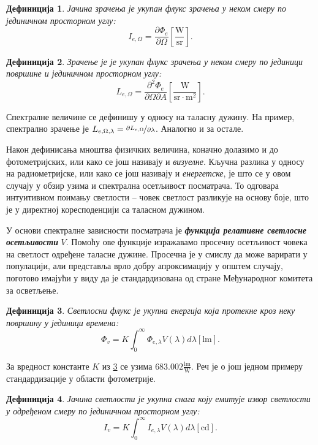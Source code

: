 \documentclass[12pt, a4paper, twoside]{book}
\numberwithin{equation}{chapter}
\numberwithin{theorem}{section}
\newtheorem{definition}{Дефиниција}
\numberwithin{definition}{section}
\numberwithin{definitionChapter}{chapter}
\begin{document}
\begin{definition}
	Јачина зрачења је укупан флукс зрачења у неком смеру по јединичном просторном углу:
	$$I_{e, \Omega} = \frac{\partial \Phi_e}{\partial \Omega} \left[\mathrm{\frac{W}{sr}}\right].$$
\end{definition}

\begin{definition}
	Зрачење је је укупан флукс зрачења у неком смеру по јединици површине и јединичном просторном углу:
	$$L_{e, \Omega} = \frac{\partial^2 \Phi_e}{\partial \Omega \partial A} \left[\mathrm{\frac{W}{sr \cdot m^2}}\right].$$
\end{definition}

Спектралне величине се дефинишу у односу на таласну дужину. На пример, спектрално зрачење
је $L_{e, \Omega, \lambda} = \nicefrac{\partial L_{e, \Omega}}{\partial \lambda}$.
Аналогно и за остале.

Након дефинисања мноштва физичких величина, коначно долазимо и до фотометријских, или како се
још називају и \textit{визуелне}. Кључна разлика у односу на радиометријске, или како се још
називају и \textit{енергетске}, је што се у овом случају у обзир узима и спектрална
осетљивост посматрача. То одговара интуитивном поимању светлости -- човек светлост разликује на
основу боје, што је у директној коресподенцији са таласном дужином.

У основи спектралне зависности посматрача је \textbf{\textit{функција релативне светлосне осетљивости}} $V$.
Помоћу ове функције изражавамо просечну осетљивост човека на светлост одређене таласне дужине.
Просечна је у смислу да може варирати у популацији, али представља врло добру апроксимацију
у општем случају, поготово имајући у виду да је стандардизована од стране Међународног комитета
за осветљење.

\begin{definition}
	Светлосни флукс је укупна енергија која протекне кроз неку површину у јединици времена:
	$$\Phi_v = K\int_{0}^{\infty}\Phi_{e, \lambda} V(\lambda)d\lambda \left[\mathrm{lm}\right].$$
	\label{eqn-luminuous-flux}
\end{definition}

За вредност константе $K$ из \ref{eqn-luminuous-flux} се узима $683.002 \mathrm{\frac{lm}{W}}$. Реч
је о још једном примеру стандардизације у области фотометрије.

\begin{definition}
	Јачина светлости је укупна снага коју емитује извор светлости у одређеном смеру по јединичном
	просторном углу:
	$$I_v = K \int_{0}^{\infty}I_{e, \lambda}V(\lambda)d\lambda \left[\mathrm{cd}\right].$$
\end{definition}
\end{document}
